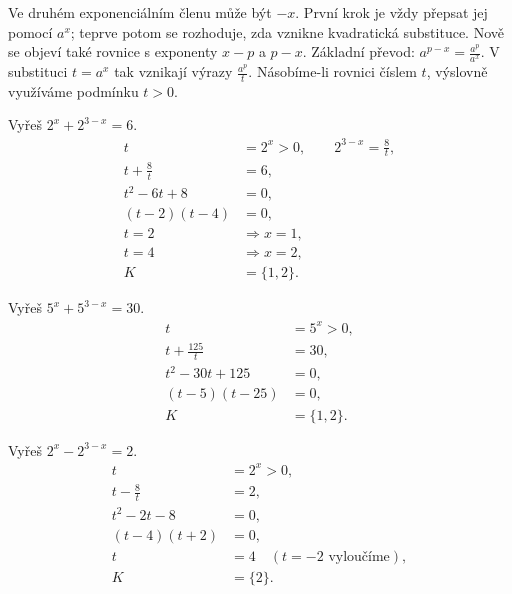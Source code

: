 \documentclass[11pt,a4paper]{article}
\begin{document}
Ve druhém exponenciálním členu může být $-x$. První krok je vždy přepsat jej pomocí $a^x$; teprve potom se rozhoduje, zda vznikne kvadratická substituce. Nově se objeví také rovnice s exponenty $x-p$ a $p-x$.
Základní převod: $a^{p-x}=\frac{a^p}{a^x}$. V substituci $t=a^x$ tak vznikají výrazy $\frac{a^p}{t}$. Násobíme-li rovnici číslem $t$, výslovně využíváme podmínku $t>0$.
\begin{prikladReseniBox}[title={Příklad 1}]
Vyřeš $2^x+2^{3-x}=6$.
\tcblower
\[
\begin{aligned}t&=2^x>0,\qquad 2^{3-x}=\frac{8}{t},\\t+\frac{8}{t}&=6,\\t^2-6t+8&=0,\\(t-2)(t-4)&=0,\\t=2&\Rightarrow x=1,\\t=4&\Rightarrow x=2,\\K&=\{1,2\}.\end{aligned}
\]

\end{prikladReseniBox}
\begin{prikladReseniBox}[title={Příklad 2}]
Vyřeš $5^x+5^{3-x}=30$.
\tcblower
\[
\begin{aligned}t&=5^x>0,\\t+\frac{125}{t}&=30,\\t^2-30t+125&=0,\\(t-5)(t-25)&=0,\\K&=\{1,2\}.\end{aligned}
\]

\end{prikladReseniBox}
\begin{prikladReseniBox}[title={Příklad 3}]
Vyřeš $2^x-2^{3-x}=2$.
\tcblower
\[
\begin{aligned}t&=2^x>0,\\t-\frac{8}{t}&=2,\\t^2-2t-8&=0,\\(t-4)(t+2)&=0,\\t&=4\quad(t=-2\text{ vyloučíme}),\\K&=\{2\}.\end{aligned}
\]

\end{prikladReseniBox}
\end{document}
